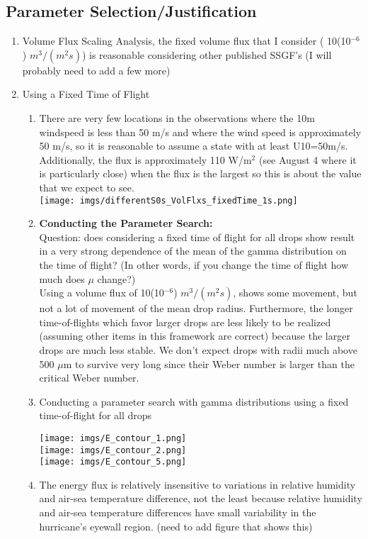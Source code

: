 \documentclass[10pt,a4paper]{article}
\begin{document}
\subsection{Parameter Selection/Justification}
\begin{enumerate}
\item Volume Flux Scaling Analysis, the fixed volume flux that I consider ( 10(10$^{-6}$) $m^3/(m^2 s)$) is reasonable considering other published SSGF's (I will probably need to add a few more)\\

\item Using a Fixed Time of Flight\\
\begin{enumerate}
\item
There are very few locations in the observations where the 10m windspeed is less than 50 m/s and where the wind speed is approximately 50 m/s, so it is reasonable to assume a state with at least U10=50m/s. Additionally, the flux is approximately 110 W/m$^2$ (see August 4 where it is particularly close) when the flux is the largest so this is about the value that we expect to see.\\
\hspace*{-.5in}\texttt{[image: imgs/differentS0s\_VolFlxs\_fixedTime\_1s.png]}\\

\item \textbf{Conducting the Parameter Search:} \\
Question: does considering a fixed time of flight for all drops show result in a very strong dependence of the mean of the gamma distribution on the time of flight? (In other words, if you change the time of flight how much does $\mu$ change?)\\
Using a volume flux of 10(10$^{-6}$) $m^3/(m^2 s)$, shows some movement, but not a lot of movement of the mean drop radius. Furthermore, the longer time-of-flights which favor larger drops are less likely to be realized (assuming other items in this framework are correct) because the larger drops are much less stable. We don't expect drops with radii much above 500 $\mu$m to survive very long since their Weber number is larger than the critical Weber number. \\
\item Conducting a parameter search with gamma distributions using a fixed time-of-flight for all drops
\begin{center}
\texttt{[image: imgs/E\_contour\_1.png]}\\
\texttt{[image: imgs/E\_contour\_2.png]}\\
\texttt{[image: imgs/E\_contour\_5.png]}
\end{center}
\item The energy flux is relatively insensitive to variations in relative humidity and air-sea temperature difference, not the least because relative humidity and air-sea temperature differences have small variability in the hurricane's eyewall region. (need to add figure that shows this) \\
\end{enumerate}


\end{enumerate}
\end{document}
